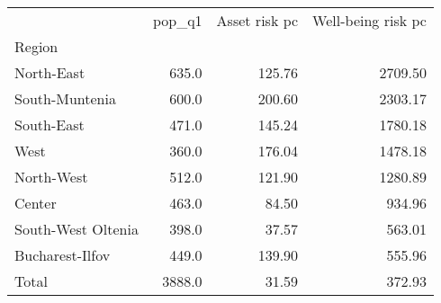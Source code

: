 \begin{tabular}{lrrr}
\toprule
{} &  pop\_q1 &  Asset risk pc &  Well-being risk pc \\
Region             &         &                &                     \\
\midrule
North-East         &   635.0 &         125.76 &             2709.50 \\
South-Muntenia     &   600.0 &         200.60 &             2303.17 \\
South-East         &   471.0 &         145.24 &             1780.18 \\
West               &   360.0 &         176.04 &             1478.18 \\
North-West         &   512.0 &         121.90 &             1280.89 \\
Center             &   463.0 &          84.50 &              934.96 \\
South-West Oltenia &   398.0 &          37.57 &              563.01 \\
Bucharest-Ilfov    &   449.0 &         139.90 &              555.96 \\
Total              &  3888.0 &          31.59 &              372.93 \\
\bottomrule
\end{tabular}
